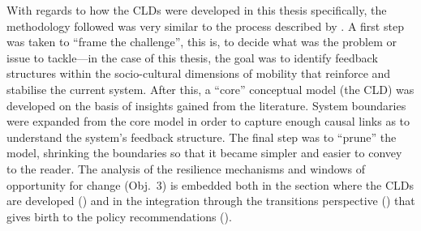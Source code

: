 With regards to how the CLDs were developed in this thesis specifically, the methodology followed was very similar to the process described by \textcite{laurenti2015_TowardsAddressingUnintended}. A first step was taken to ``frame the challenge'', this is, to decide what was the problem or issue to tackle---in the case of this thesis, the goal was to identify feedback structures within the socio-cultural dimensions of mobility that reinforce and stabilise the current system. After this, a ``core'' conceptual model (the CLD) was developed on the basis of insights gained from the literature. System boundaries were expanded from the core model in order to capture enough causal links as to understand the system's feedback structure. The final step was to ``prune'' the model, shrinking the boundaries so that it became simpler and easier to convey to the reader. The analysis of the resilience mechanisms and windows of opportunity for change (Obj.~3) is embedded both in the section where the CLDs are developed () and in the integration through the transitions perspective () that gives birth to the policy recommendations ().